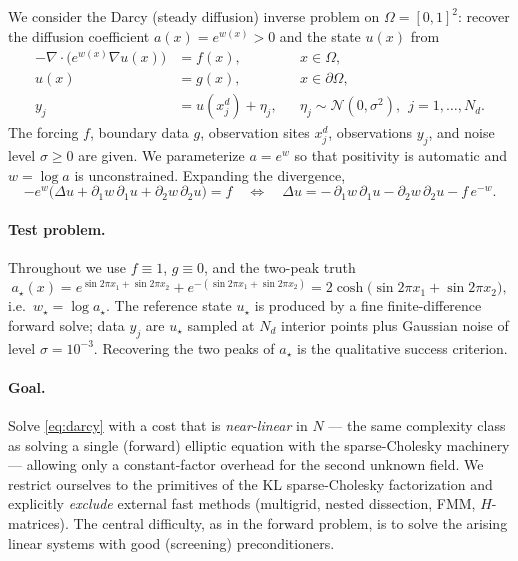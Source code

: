 \documentclass[11pt]{article}
\newcommand{\cN}{\mathcal{N}}
\newcommand{\Omegabd}{\partial\Omega}
\begin{document}
We consider the Darcy (steady diffusion) inverse problem on $\Omega=[0,1]^2$:
recover the diffusion coefficient $a(x)=e^{w(x)}>0$ and the state $u(x)$ from
\begin{equation}\label{eq:darcy}
\begin{aligned}
-\nabla\!\cdot\!\bigl(e^{w(x)}\nabla u(x)\bigr) &= f(x), && x\in\Omega,\\
u(x) &= g(x), && x\in\Omegabd,\\
y_j &= u(x_j^{d}) + \eta_j, && \eta_j\sim\cN(0,\sigma^2),\ \ j=1,\dots,N_d.
\end{aligned}
\end{equation}
The forcing $f$, boundary data $g$, observation sites $x_j^d$, observations
$y_j$, and noise level $\sigma\ge 0$ are given. We parameterize $a=e^w$ so that
positivity is automatic and $w=\log a$ is unconstrained. Expanding the
divergence,
\begin{equation}\label{eq:pde-expanded}
-e^{w}\bigl(\Delta u + \partial_1 w\,\partial_1 u + \partial_2 w\,\partial_2 u\bigr)=f
\quad\Longleftrightarrow\quad
\Delta u = -\,\partial_1 w\,\partial_1 u - \partial_2 w\,\partial_2 u - f\,e^{-w}.
\end{equation}

\paragraph{Test problem.} Throughout we use $f\equiv 1$, $g\equiv 0$, and the
two-peak truth
\begin{equation}
a_\star(x) = e^{\sin 2\pi x_1+\sin 2\pi x_2}
           + e^{-(\sin 2\pi x_1+\sin 2\pi x_2)}
         = 2\cosh\!\bigl(\sin 2\pi x_1+\sin 2\pi x_2\bigr),
\end{equation}
i.e.\ $w_\star=\log a_\star$. The reference state $u_\star$ is produced by a
fine finite-difference forward solve; data $y_j$ are $u_\star$ sampled at $N_d$
interior points plus Gaussian noise of level $\sigma=10^{-3}$. Recovering the
two peaks of $a_\star$ is the qualitative success criterion.

\paragraph{Goal.} Solve \eqref{eq:darcy} with a cost that is \emph{near-linear}
in $N$ --- the same complexity class as solving a single (forward) elliptic
equation with the sparse-Cholesky machinery --- allowing only a constant-factor
overhead for the second unknown field. We restrict ourselves to the primitives
of the KL sparse-Cholesky factorization and explicitly \emph{exclude} external
fast methods (multigrid, nested dissection, FMM, $H$-matrices). The central
difficulty, as in the forward problem, is to solve the arising linear systems
with good (screening) preconditioners.
\end{document}
